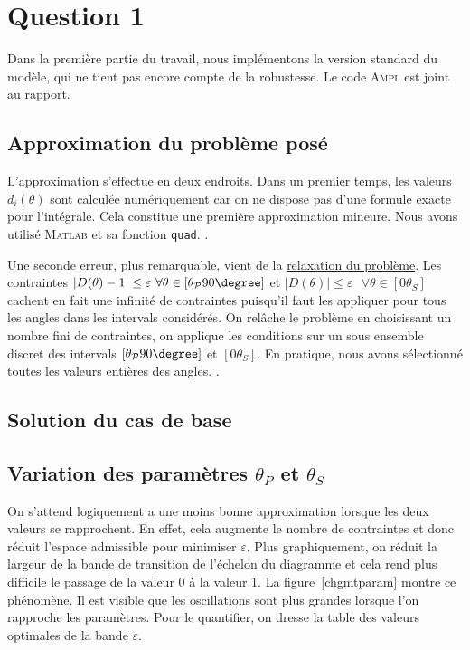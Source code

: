 \section*{Question 1}
 
 Dans la première partie du travail, nous implémentons la version standard du modèle, qui ne tient pas encore compte de la robustesse. Le code \textsc{Ampl} est joint au rapport. 
 
 \subsection*{Approximation du problème posé}
L'approximation s'effectue en deux endroits. Dans un premier temps, les valeurs $d_{i}(\theta)$ sont calculée numériquement car on ne dispose pas d'une formule exacte pour l'intégrale. Cela constitue une première approximation mineure. Nous avons utilisé \textsc{Matlab} et sa fonction \texttt{quad}. .

Une seconde erreur, plus remarquable, vient de la \underline{relaxation du problème}. 
Les contraintes $|D(\theta)-1| \leq \varepsilon\text{ } \forall \theta\in [\theta_{\mathcal{P}} 90\degree]$ et $|D(\theta)| \leq \varepsilon\text{ } \forall \theta\in [0 \theta_{S}]$ cachent en fait une infinité de contraintes puisqu'il faut les appliquer pour tous les angles dans les intervals considérés.
On relâche le problème en choisissant un nombre fini de contraintes, on applique les conditions sur un sous ensemble discret des intervals $[\theta_{\mathcal{P}} 90\degree]$ et $[0 \theta_{S}]$. En pratique, nous avons sélectionné toutes les valeurs entières des angles. .


\subsection*{Solution du cas de base}


\subsection*{Variation des paramètres $\theta_{P}$ et $\theta_{S}$}
On s'attend logiquement a une moins bonne approximation lorsque les deux valeurs se rapprochent. En effet, cela augmente le nombre de contraintes et donc réduit l'espace admissible pour minimiser $\varepsilon$. Plus graphiquement, on réduit la largeur de la bande de transition de l'échelon du diagramme et cela rend plus difficile le passage de la valeur $0$ à la valeur $1$. La figure~\ref{chgmtparam} montre ce phénomène. Il est visible que les oscillations sont plus grandes lorsque l'on rapproche les paramètres. Pour le quantifier, on dresse la table des valeurs optimales de la bande $\varepsilon$.



